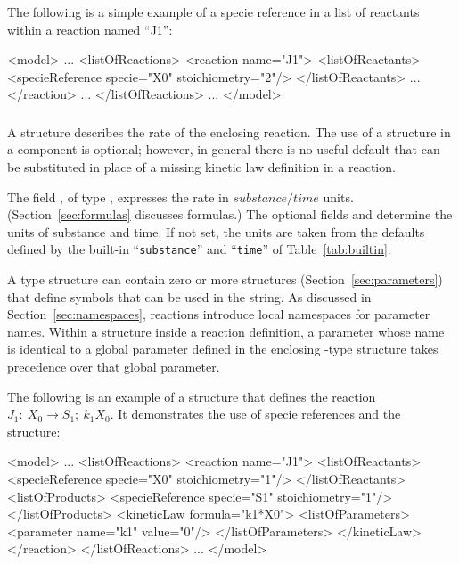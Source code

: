 \documentclass[10pt]{cekarticle}
\newcommand{\vref}[1]{\ref{#1}}
\begin{document}
The following is a simple example of a specie reference in a list of
reactants within a reaction named ``J1'':
\begin{example}
<model>
    ...
    <listOfReactions>
        <reaction name="J1">
            <listOfReactants>
                <specieReference specie="X0" stoichiometry="2"/>
            </listOfReactants>
            ...
        </reaction>
        ...
    </listOfReactions>
    ...
</model>
\end{example}


\subsubsection{}
\label{subsec:kinetic-law}

A  structure describes the rate of the enclosing
reaction.  The use of a  structure in a 
component is optional; however, in general there is no useful default that
can be substituted in place of a missing kinetic law definition in a
reaction.

The field , of type , expresses the rate in
$substance/time$ units.  (Section~\ref{sec:formulas} discusses formulas.)
The optional fields  and 
determine the units of substance and time.  If not set, the units are taken
from the defaults defined by the built-in ``\texttt{substance}'' and
``\texttt{time}'' of Table~\vref{tab:builtin}.

A  type structure can contain zero or more
 structures (Section~\ref{sec:parameters}) that define
symbols that can be used in the  string.  As discussed in
Section~\ref{sec:namespaces}, reactions introduce local namespaces for
parameter names.  Within a  structure inside a reaction
definition, a parameter whose name is identical to a global parameter
defined in the enclosing -type structure takes precedence over
that global parameter.

The following is an example of a  structure that defines
the reaction $J_1: \ X_0 \longrightarrow S_1; \ k_1 X_0$.  It demonstrates
the use of specie references and the  structure:
\begin{example}
<model>
    ...
    <listOfReactions>
        <reaction name="J1">
            <listOfReactants>
                <specieReference specie="X0" stoichiometry="1"/>
            </listOfReactants>
            <listOfProducts>
                <specieReference specie="S1" stoichiometry="1"/>
            </listOfProducts>
            <kineticLaw formula="k1*X0">
                <listOfParameters>
                    <parameter name="k1" value="0"/>
                </listOfParameters>
            </kineticLaw>
        </reaction>
    </listOfReactions>
    ...
</model>
\end{example}
\end{document}
